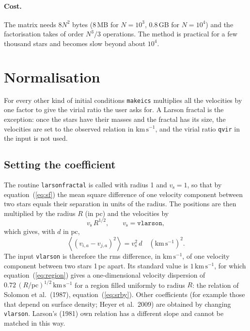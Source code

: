 \documentclass[11pt,a4paper]{article}
\newcommand{\kms}{\mathrm{km\,s^{-1}}}
\newcommand{\vs}{v_{\mathrm s}}
\newcommand{\avg}[1]{\left\langle #1 \right\rangle}
\begin{document}
\paragraph{Cost.} The matrix needs $8N^2$ bytes (8\,MB for $N=10^3$,
0.8\,GB for $N=10^4$) and the factorisation takes of order $N^3/3$
operations. The method is practical for a few thousand stars and
becomes slow beyond about $10^4$.

\section{Normalisation}
\label{sec:norm}

For every other kind of initial conditions \texttt{makeics} multiplies
all the velocities by one factor to give the virial ratio the user asks
for. A Larson fractal is the exception: once the stars have their masses
and the fractal has its size, the velocities are set to the observed
relation in $\kms$, and the virial ratio \texttt{qvir} in the input is
not used.

\subsection{Setting the coefficient}

The routine \texttt{larsonfractal} is called with radius 1 and $\vs =
1$, so that by equation~(\ref{eq:sf}) the mean square difference of one
velocity component between two stars equals their separation in units of
the radius. The positions are then multiplied by the radius $R$ (in pc)
and the velocities by
\begin{equation}
  \vs\,R^{1/2}, \qquad \vs = \texttt{vlarson},
\end{equation}
which gives, with $d$ in pc,
\begin{equation}
  \avg{(v_{i,a}-v_{j,a})^2} = \vs^2\,d
  \quad(\kms)^2 .
\end{equation}
The input \texttt{vlarson} is therefore the rms difference, in $\kms$, of
one velocity component between two stars 1\,pc apart. Its standard value
is $1\,\kms$, for which equation~(\ref{eq:region}) gives a
one-dimensional velocity dispersion of $0.72\,(R/\mathrm{pc})^{1/2}\,
\kms$ for a region filled uniformly to radius $R$: the relation of
Solomon et al.\ (1987), equation~(\ref{eq:srby}). Other coefficients
(for example those that depend on surface density; Heyer et al.\ 2009)
are obtained by changing \texttt{vlarson}. Larson's (1981) own relation
has a different slope and cannot be matched in this way.
\end{document}
